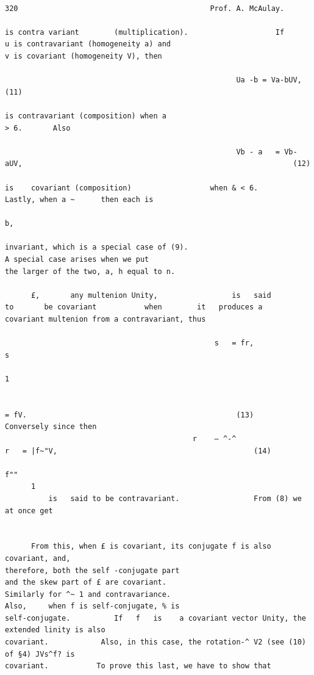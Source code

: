 \documentclass[10pt]{article}
\begin{document}
\begin{verbatim}

320                                            Prof. A. McAulay.

is contra variant        (multiplication).                    If       u is contravariant (homogeneity a) and
v is covariant (homogeneity V), then

                                                     Ua -b = Va-bUV,                                                                 (11)

is contravariant (composition) when a                                  > 6.       Also

                                                     Vb - a   = Vb-aUV,                                                              (12)

is    covariant (composition)                  when & < 6.                      Lastly, when a ~      then each is
                                                                                                              b,

invariant, which is a special case of (9).                                      A special case arises when we put
the larger of the two, a, h equal to n.

      £,       any multenion Unity,                 is   said          to       be covariant           when        it   produces a
covariant multenion from a contravariant, thus

                                                s   = fr,               s
                                                                            1

                                                                                = fV.                                                (13)
Conversely since then
                                           r    — ^-^                       r   = |f~"V,                                             (14)

f""
      1
          is   said to be contravariant.                 From (8) we at once get


      From this, when £ is covariant, its conjugate f is also covariant, and,
therefore, both the self -conjugate part                               and the skew part of £ are covariant.
Similarly for ^~ 1 and contravariance.                                      Also,     when f is self-conjugate, % is
self-conjugate.          If   f   is    a covariant vector Unity, the extended linity is also
covariant.            Also, in this case, the rotation-^ V2 (see (10) of §4) JVs^f? is
covariant.           To prove this last, we have to show that




\end{verbatim}
\end{document}
